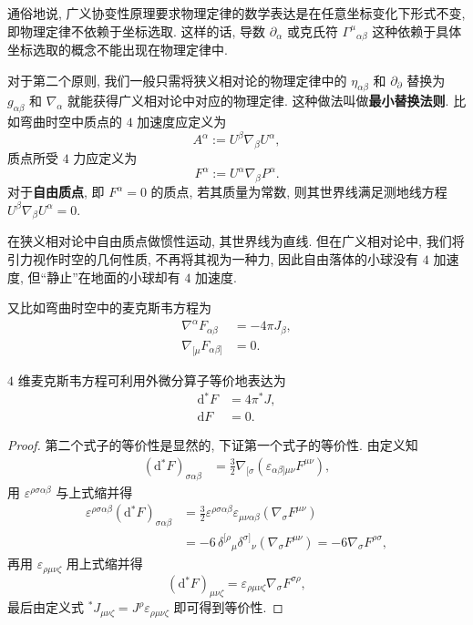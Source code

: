 通俗地说, 广义协变性原理要求物理定律的数学表达是在任意坐标变化下形式不变, 即物理定律不依赖于坐标选取. 这样的话, 导数 $\partial_\alpha$ 或克氏符 $\Gamma^\mu{}_{\alpha\beta}$ 这种依赖于具体坐标选取的概念不能出现在物理定律中.

对于第二个原则, 我们一般只需将狭义相对论的物理定律中的 $\eta_{\alpha\beta}$ 和 $\partial_\partial$ 替换为 $g_{\alpha\beta}$ 和 $\nabla_\alpha$ 就能获得广义相对论中对应的物理定律. 这种做法叫做{\bf 最小替换法则}. 比如弯曲时空中质点的 $4$ 加速度应定义为
\[A^\alpha:=U^\beta\nabla_\beta U^\alpha,\]
质点所受 $4$ 力应定义为
\[F^\alpha:=U^\alpha\nabla_\beta P^\alpha.\]
对于{\bf 自由质点}, 即 $F^\alpha=0$ 的质点, 若其质量为常数, 则其世界线满足测地线方程 $U^\beta\nabla_\beta U^\alpha=0$.
\begin{remark}
	在狭义相对论中自由质点做惯性运动, 其世界线为直线. 但在广义相对论中, 我们将引力视作时空的几何性质, 不再将其视为一种力, 因此自由落体的小球没有 $4$ 加速度, 但``静止''在地面的小球却有 $4$ 加速度.
\end{remark}
又比如弯曲时空中的麦克斯韦方程为
\begin{align*}
	\nabla^\alpha F_{\alpha\beta} &= -4\pi J_\beta,\\
	\nabla_{[\mu}F_{\alpha\beta]}&=0.
\end{align*}
\begin{proposition}
	$4$ 维麦克斯韦方程可利用外微分算子等价地表达为
	\begin{align*}
	\mathrm{d}{}^{*}\!F&=4\pi{}^{*}\!J,\\
	\mathrm{d}F&=0.
	\end{align*}
\end{proposition}
\begin{proof}
	第二个式子的等价性是显然的, 下证第一个式子的等价性. 由定义知
	\begin{align*}
		(\mathrm{d}{}^{*}\!F)_{\sigma\alpha\beta} &=\frac{3}{2}\nabla_{[\sigma}(\varepsilon_{\alpha\beta]\mu\nu}F^{\mu\nu}),
	\end{align*}
	用 $\varepsilon^{\rho\sigma\alpha\beta}$ 与上式缩并得
	\begin{align*}
		\varepsilon^{\rho\sigma\alpha\beta}(\mathrm{d}{}^{*}\!F)_{\sigma\alpha\beta}&=\frac{3}{2}\varepsilon^{\rho\sigma\alpha\beta}\varepsilon_{\mu\nu\alpha\beta}(\nabla_\sigma F^{\mu\nu})\\
		&=-6\,\delta^{[\rho}{}_{\mu}\delta^{\sigma]}{}_{\nu}(\nabla_\sigma F^{\mu\nu})=-6\nabla_\sigma F^{\rho\sigma},
	\end{align*}
	再用 $\varepsilon_{\rho\mu\nu\zeta}$ 用上式缩并得
	$$ (\mathrm{d}{}^{*}\!F)_{\mu\nu\zeta}=\varepsilon_{\rho \mu\nu\zeta}\nabla_\sigma F^{\sigma\rho}, $$
	最后由定义式 ${}^{*}\!J_{\mu\nu\zeta}=J^\rho\varepsilon_{\rho\mu\nu\zeta}$ 即可得到等价性. 
\end{proof}

